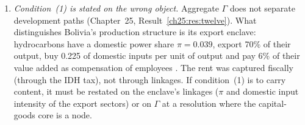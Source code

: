\documentclass[../structural_economics_book.tex]{subfiles}
\begin{document}
\begin{remark}
\begin{enumerate}
\item \emph{Condition~(1) is stated on the wrong object.} Aggregate $\Gamma$ does not separate development paths (Chapter~25, Result~\ref{ch25:res:twelve}). What distinguishes Bolivia's production structure is its export enclave: hydrocarbons have a domestic power share $\pi = 0.039$, export 70\% of their output, buy 0.225 of domestic inputs per unit of output and pay 6\% of their value added as compensation of employees \citep{ine2026sut}. The rent was captured fiscally (through the IDH tax), not through linkages. If condition~(1) is to carry content, it must be restated on the enclave's linkages ($\pi$ and domestic input intensity of the export sectors) or on $\Gamma$ at a resolution where the capital-goods core is a node.
\end{enumerate}
\end{remark}
\end{document}
